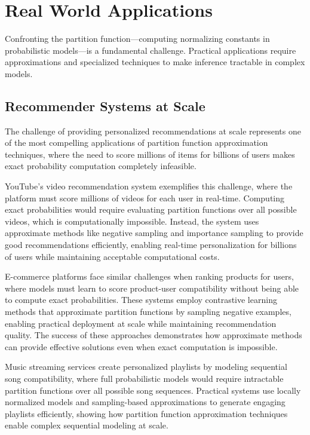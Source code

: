 
\section{Real World Applications}
\label{sec:partition-real-world}


Confronting the partition function—computing normalizing constants in probabilistic models—is a fundamental challenge. Practical applications require approximations and specialized techniques to make inference tractable in complex models.

\subsection{Recommender Systems at Scale}

The challenge of providing personalized recommendations at scale represents one of the most compelling applications of partition function approximation techniques, where the need to score millions of items for billions of users makes exact probability computation completely infeasible.

YouTube's video recommendation system exemplifies this challenge, where the platform must score millions of videos for each user in real-time. Computing exact probabilities would require evaluating partition functions over all possible videos, which is computationally impossible. Instead, the system uses approximate methods like negative sampling and importance sampling to provide good recommendations efficiently, enabling real-time personalization for billions of users while maintaining acceptable computational costs.

E-commerce platforms face similar challenges when ranking products for users, where models must learn to score product-user compatibility without being able to compute exact probabilities. These systems employ contrastive learning methods that approximate partition functions by sampling negative examples, enabling practical deployment at scale while maintaining recommendation quality. The success of these approaches demonstrates how approximate methods can provide effective solutions even when exact computation is impossible.

Music streaming services create personalized playlists by modeling sequential song compatibility, where full probabilistic models would require intractable partition functions over all possible song sequences. Practical systems use locally normalized models and sampling-based approximations to generate engaging playlists efficiently, showing how partition function approximation techniques enable complex sequential modeling at scale.

